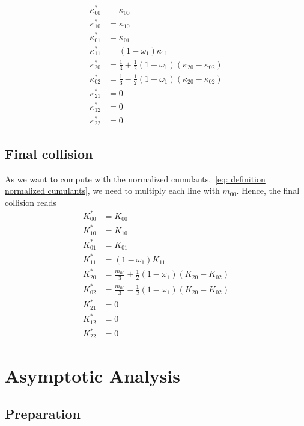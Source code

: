 \documentclass{article}
\begin{document}
\begin{equation}
  \begin{aligned}
    \kappa_{00}^{*} & = \kappa_{00} \\
    \kappa_{10}^{*} & = \kappa_{10} \\
    \kappa_{01}^{*} & = \kappa_{01} \\
    \kappa_{11}^{*} & = (1-\omega_1)\kappa_{11} \\
    \kappa_{20}^{*} & = \frac{1}{3} + \frac{1}{2}(1-\omega_1) (\kappa_{20} - \kappa_{02}) \\
    \kappa_{02}^{*} & = \frac{1}{3} - \frac{1}{2}(1-\omega_1) (\kappa_{20} - \kappa_{02}) \\
    \kappa_{21}^{*} & = 0 \\
    \kappa_{12}^{*} & = 0 \\
    \kappa_{22}^{*} & = 0
  \end{aligned}
\end{equation}

\subsection{Final collision}
\label{sub:Final collision}
As we want to compute with the normalized cumulants,~\eqref{eq: definition normalized cumulants}, we need to multiply each line with $m_{00}$. Hence, the final collision reads
\begin{equation}
  \begin{aligned}
    K_{00}^{*} & = K_{00} \\
    K_{10}^{*} & = K_{10} \\
    K_{01}^{*} & = K_{01} \\
    K_{11}^{*} & = (1-\omega_1)K_{11} \\
    K_{20}^{*} & = \frac{m_{00}}{3} + \frac{1}{2}(1-\omega_1) (K_{20} - K_{02}) \\
    K_{02}^{*} & = \frac{m_{00}}{3} - \frac{1}{2}(1-\omega_1) (K_{20} - K_{02}) \\
    K_{21}^{*} & = 0 \\
    K_{12}^{*} & = 0 \\
    K_{22}^{*} & = 0
  \end{aligned}
\end{equation}

\section{Asymptotic Analysis}
\label{sec:Asymptotic Analysis}
\subsection{Preparation}
\label{sub:Preparation}
\end{document}
